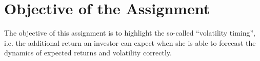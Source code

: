\chapter{Objective of the Assignment}
The objective of this assignment is to highlight the so-called “volatility timing”, i.e. the additional return an investor can expect when she is able to forecast the dynamics of expected returns and volatility correctly. 